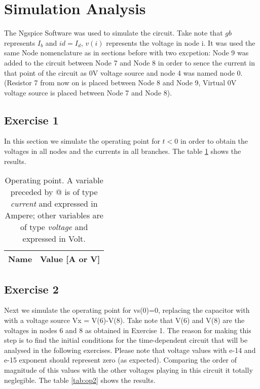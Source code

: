 \section{Simulation Analysis}
\label{sec:simulation}
The Ngspice Software was used to simulate the circuit. Take note that $gb$
represents $I_b$ and $id = I_d$, $v(i)$ represents the voltage in node i.
It was used the same Node nomenclature as in sections before with two excpetion: 
Node 9 was added to the circuit between Node 7 and Node 8 in order to sence the current
in that point of the circuit as 0V voltage source and node 4 was named node 0. (Resistor 7 from now on is placed
between Node 8 and Node 9, Virtual 0V voltage source is placed between Node 7 and Node 8).


\subsection{Exercise 1}
In this section we simulate the operating point for $t<0$ in order to obtain the
voltages in all nodes and the currents in all branches.
The table \ref{tab:op1} shows the results.

\begin{table}[ht]
  \centering
  \begin{tabular}{|c|c|}
    \hline    
    {\bf Name} & {\bf Value [A or V]} \\ \hline
    
  \end{tabular}
  \vspace{20mm}
  \caption{Operating point. A variable preceded by @ is of type {\em current}
    and expressed in Ampere; other variables are of type {\it voltage} and expressed in
    Volt.}
  \label{tab:op1}
\end{table}

\newpage

\subsection{Exercise 2}
Next we simulate the operating point for vs(0)=0, replacing the capacitor with  with a 
voltage source Vx = V(6)-V(8). Take note that V(6) and V(8) are the voltages in nodes 6 and 8 as obtained in Exercise 1.
The reason for making this step is to find the initial conditions for the time-dependent circuit
that will be analysed in the following exercises.
Please note that voltage values with e-14 and e-15 exponent should represent zero (as expected).
Comparing the order of magnitude of this values with the other voltages playing in this circuit it totally neglegible.
The table \ref{tab:op2} shows the results.

